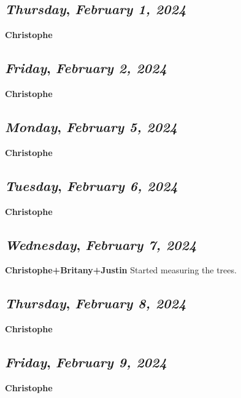 \begin{center}
\section*{\month}
\end{center}

\def\day{\textit{February 1, 2024}}
\def\weekday{\textit{Thursday}}
\subsection*{\weekday, \day}
\textbf {Christophe}

\def\day{\textit{February 2, 2024}}
\def\weekday{\textit{Friday}}
\subsection*{\weekday, \day}
\textbf {Christophe}

\def\day{\textit{February 5, 2024}}
\def\weekday{\textit{Monday}}
\subsection*{\weekday, \day}
\textbf {Christophe}

\def\day{\textit{February 6, 2024}}
\def\weekday{\textit{Tuesday}}
\subsection*{\weekday, \day}
\textbf {Christophe}

\def\day{\textit{February 7, 2024}}
\def\weekday{\textit{Wednesday}}
\subsection*{\weekday, \day}
\textbf {Christophe+Britany+Justin}
Started measuring the trees. 

\def\day{\textit{February 8, 2024}}
\def\weekday{\textit{Thursday}}
\subsection*{\weekday, \day}
\textbf {Christophe}

\def\day{\textit{February 9, 2024}}
\def\weekday{\textit{Friday}}
\subsection*{\weekday, \day}
\textbf {Christophe}

\def\day{\textit{February 11, 2024}}
\def\weekday{\textit{Sunday}}
